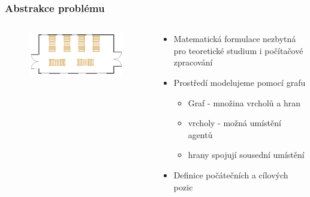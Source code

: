 \documentclass[aspectratio=169,t,xcolor=table]{beamer}
\begin{document}
\begin{frame}
\frametitle{Abstrakce problému}
\begin{columns}
\begin{column}{.4\textwidth}
    \begin{figure}
        \vspace{-20pt}
        \includegraphics[width=1\textwidth]{figs/warehouse-plan-transp.png}
    \end{figure}
    
     \begin{figure}
        \hspace{-10pt}
        \vspace{-30pt}
    \end{figure}
\end{column}
\begin{column}{.6\textwidth}
\begin{itemize}
\item Matematická formulace nezbytná pro teoretické studium i počítačové zpracování
\item Prostředí modelujeme pomocí grafu
    \begin{itemize}
    \item Graf - množina vrcholů a hran
    \item vrcholy - možná umístění agentů
    \item hrany spojují sousední umístění 
    \end{itemize}
    \item Definice počátečních a cílových pozic
\end{itemize}

\end{column}


\end{columns}
\end{frame}
\end{document}
